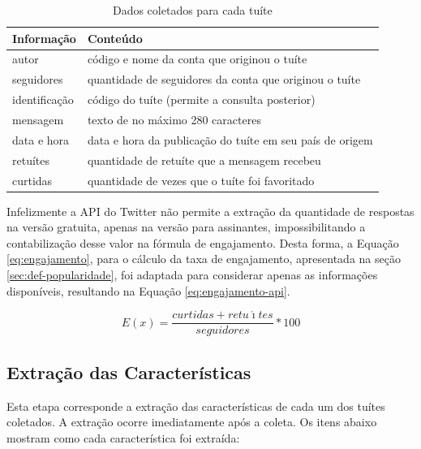 \documentclass[oneside,openright,12pt]{ufsm_2015} %
\begin{document}
    \begin{table}[ht]
    \centering
    \caption{Dados coletados para cada tuíte}
    \label{tab:dados-coleta}
    \begin{tabular}{|l|l|}
    \hline
    \textbf{Informação} & \textbf{Conteúdo} \\ \hline
    autor &  código e nome da conta que originou o tuíte \\ \hline
    seguidores &  quantidade de seguidores da conta que originou o tuíte \\ \hline
    identificação & código do tuíte (permite a consulta posterior) \\ \hline
    mensagem & texto de no máximo 280 caracteres \\ \hline
    data e hora & data e hora da publicação do tuíte em seu país de origem \\ \hline
    retuítes & quantidade de retuíte que a mensagem recebeu \\ \hline
    curtidas & quantidade de vezes que o tuíte foi favoritado \\ \hline
    \end{tabular}
    \end{table}
    
    \par Infelizmente a API do Twitter não permite a extração da quantidade de respostas na versão gratuita, apenas na versão para assinantes, impossibilitando a contabilização desse valor na fórmula de engajamento. Desta forma, a Equação \ref{eq:engajamento}, para o cálculo da taxa de engajamento, apresentada na seção \ref{sec:def-popularidade}, foi adaptada para considerar apenas as informações disponíveis, resultando na Equação \ref{eq:engajamento-api}.
    
    \begin{equation} \label{eq:engajamento-api}
    E(x) = \frac{curtidas + retu\acute{\imath}tes}{seguidores}*100
    \end{equation}

\subsection{Extração das Características}

    \par Esta etapa corresponde a extração das características de cada um dos tuítes coletados. A extração ocorre imediatamente após a coleta. Os itens abaixo mostram como cada característica foi extraída:
    
\end{document}
